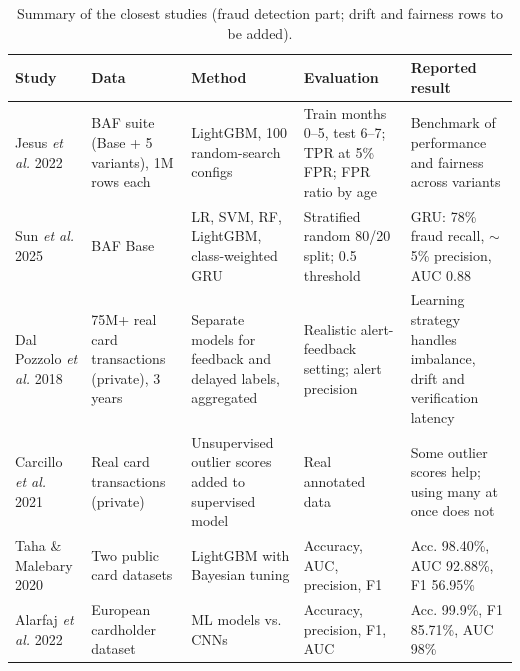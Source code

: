 \begin{table}[!t]
\centering
\caption{Summary of the closest studies (fraud detection part; drift and fairness rows to be added).}
\label{tab:related-summary}
\footnotesize
\begin{tabular}{p{2.0cm}p{3.0cm}p{3.6cm}p{3.6cm}p{3.6cm}}
\hline
\textbf{Study} & \textbf{Data} & \textbf{Method} & \textbf{Evaluation} & \textbf{Reported result} \\
\hline
Jesus \textit{et al.} 2022 \cite{jesus2022turning} & BAF suite (Base + 5 variants), 1M rows each & LightGBM, 100 random-search configs & Train months 0--5, test 6--7; TPR at 5\% FPR; FPR ratio by age & Benchmark of performance and fairness across variants \\
Sun \textit{et al.} 2025 \cite{sun2025objective} & BAF Base & LR, SVM, RF, LightGBM, class-weighted GRU & Stratified random 80/20 split; 0.5 threshold & GRU: 78\% fraud recall, $\sim$5\% precision, AUC 0.88 \\
Dal Pozzolo \textit{et al.} 2018 \cite{dalpozzolo2018credit} & 75M+ real card transactions (private), 3 years & Separate models for feedback and delayed labels, aggregated & Realistic alert-feedback setting; alert precision & Learning strategy handles imbalance, drift and verification latency \\
Carcillo \textit{et al.} 2021 \cite{carcillo2021combining} & Real card transactions (private) & Unsupervised outlier scores added to supervised model & Real annotated data & Some outlier scores help; using many at once does not \\
Taha \& Malebary 2020 \cite{taha2020intelligent} & Two public card datasets & LightGBM with Bayesian tuning & Accuracy, AUC, precision, F1 & Acc. 98.40\%, AUC 92.88\%, F1 56.95\% \\
Alarfaj \textit{et al.} 2022 \cite{alarfaj2022credit} & European cardholder dataset & ML models vs. CNNs & Accuracy, precision, F1, AUC & Acc. 99.9\%, F1 85.71\%, AUC 98\% \\
\hline
\end{tabular}
\end{table}
